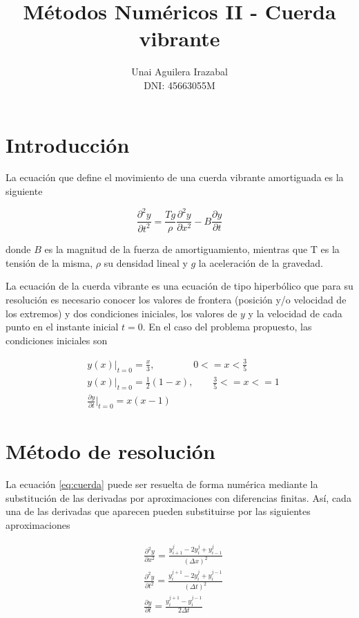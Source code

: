 \documentclass[11pt]{article}
\title{Métodos Numéricos II - Cuerda vibrante}
\author{Unai Aguilera Irazabal\\ DNI: 45663055M}
\begin{document}
\maketitle
\tableofcontents

\pagebreak
\renewcommand{\tablename}{Tabla}

\section{Introducción}
La ecuación que define el movimiento de una cuerda vibrante amortiguada es la siguiente

\begin{equation}
\frac{\partial^2 y}{\partial{t^2}} = \frac{Tg}{\rho}\frac{\partial^2 y}{\partial{x^2}} 
	- B\frac{\partial y}{\partial{t}}
\label{eq:cuerda}
\end{equation}

donde $B$ es la magnitud de la fuerza de amortiguamiento, mientras que T es la tensión de
la misma, $\rho$ su densidad lineal y $g$ la aceleración de la gravedad. 

La ecuación de la cuerda vibrante es una ecuación de tipo hiperbólico que para su resolución
es necesario conocer los valores de frontera (posición y/o velocidad de los extremos) y
dos condiciones iniciales, los valores de $y$ y la velocidad de cada punto en el instante
inicial $t=0$.
En el caso del problema propuesto, las condiciones iniciales son

\begin{subequations}
\begin{flalign}
	&y(x)|_{t=0} = \frac{x}{3},~~~~~~~~~~~~~~~~~~ 0 <= x < \frac{3}{5}\\
	&y(x)|_{t=0} = \frac{1}{2}(1 - x),~~~~~~~~~ \frac{3}{5} <= x <= 1\\
	&\frac{\partial{y}}{\partial{t}}|_{t=0} = x(x-1)
\end{flalign}
\label{eq:condiciones_iniciales}
\end{subequations}

\section{Método de resolución}
La ecuación \eqref{eq:cuerda} puede ser resuelta de forma numérica mediante la substitución
de las derivadas por aproximaciones con diferencias finitas. Así, cada una de las derivadas
que aparecen pueden substituirse por las siguientes aproximaciones

\begin{subequations}
\begin{flalign}
	&\frac{\partial^2 y}{\partial{x^2}} = \frac{y^j_{i+1} - 2y^j_i + y^j_{i-1}}{(\Delta{x})^2}\\
	&\frac{\partial^2 y}{\partial{t^2}} = \frac{y^{j+1}_i - 2y^j_i + y^{j-1}_i}{(\Delta{t})^2}\\
	&\frac{\partial{y}}{\partial{t}} = \frac{y^{j+1}_i - y^{j-1}_i}{2\Delta{t}}
\end{flalign}
\end{subequations}
\end{document}
